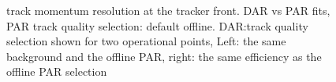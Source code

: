 \begin{figure}
  \label{fig:dar_vs_par_ann}
\caption{
  track momentum resolution at the tracker front. DAR vs PAR fits,
  PAR track quality selection: default offline.
  DAR:track quality selection shown for two operational points, Left: the same background and the offline PAR,
  right: the same efficiency as the offline PAR selection
}
\end{figure}
